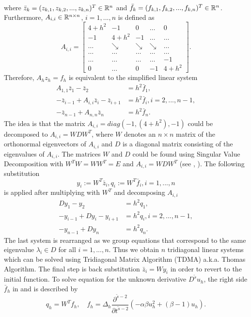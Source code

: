 \documentclass[11pt,a4paper,twoside]{article}
\begin{document}
where $\bar z_k = (z_{k,1}, z_{k,2}, ..., z_{k,n})^T\in \mathbb{R}^{n}$ and $\bar f_k = (f_{k,1}, f_{k,2}, ..., f_{k,n})^T\in \mathbb{R}^{n}$. Furthermore, $A_{i,i} \in \mathbb{R}^{n \times n}$, $i = 1, ..., n$ is defined as
\[
A_{i,i} = 
\begin{bmatrix}
    4+h^2       & -1          &  0              & \dots & 0 \\
    -1               & 4+h^2  & -1              & \dots & \dots  \\
      \dots         & \searrow     & \searrow  & \searrow  & \dots  \\
      \dots         & \dots     & \dots         & \dots   &    \dots  \\
      \dots         & \dots    & \dots         & \dots & -1  \\
     0                 & \dots   &  0               & -1    & 4+h^2
\end{bmatrix}
.
\]
Therefore, $A_h z_h = f_h$ is equivalent to the simplified linear system
\begin{align}
A_{1,1}\bar z_1 - \bar z_2 &= h^2\bar f_1, \nonumber \\
- \bar z_{i-1}  + A_{i,i}\bar z_i - \bar z_{i+1}  &= h^2\bar f_i, i = 2,...,n-1, \nonumber \\
- \bar z_{n-1} + A_{n,n}\bar z_n &= h^2\bar f_n.\label{LinSys}
\end{align}
The idea is that the matrix $A_{i,i} = diag(-1, (4+h^2), -1)$ could be decomposed to $A_{i,i}  = W D W^T$, where $W$ denotes an $n \times n$ matrix of the orthonormal eigenvectors of $A_{i,i} $ and $ D$ is a diagonal matrix consisting of the eigenvalues of $A_{i,i}$. The matrices $W$ and $D$ could be found using Singular Value Decomposition with $W^T W = W W^T = E$ and $A_{i,i} = WDW^T$ (see \cite{Tref}, \cite{FPS}). The following substitution 
\begin{equation}\label{subst}
y_i := W^T \bar z_i, q_i := W^T \bar f_i, i = 1, ...,n
\end{equation}
is applied after multiplying  with $W^T$ and decomposing $A_{i,i}$
\begin{align}
Dy_1 - y_2 &= h^2 q_1,\nonumber \\
-y_{i-1} + D y_i - y_{i+1} &= h^2 q_i, i = 2,...,n-1,\nonumber \\
- y_{n-1} + Dy_n &= h^2 q_n.\label{SubSys}
\end{align}
The last system  is rearranged as we group equations that correspond to the same eigenvalue $\lambda_i \in D$ for all $i = 1,...,n$. Thus we obtain $n$ tridiagonal linear systems which can be solved using Tridiagonal Matrix Algorithm (TDMA) a.k.a. Thomas Algorithm. The final step is back substitution $\bar z_i = W y_i$ in order to revert to the initial function. To solve equation  for the unknown derivative $D^{\tilde s}u_h$, the right side $\bar f_h$  in  and  is described by
$$
q_h = W^T f_h, \quad f_h = \Delta_h \frac{ \partial^{ \tilde s - 2 } } { \partial t^{ \tilde s - 2 } } ( -\alpha \beta u_h^2  + (\beta -1)u_h).
$$
\end{document}
